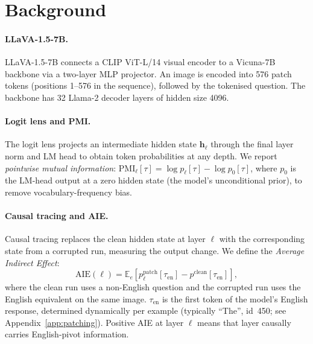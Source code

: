 \documentclass[11pt]{article}
\begin{document}
\section{Background}
\label{sec:background}

\paragraph{LLaVA-1.5-7B.}
LLaVA-1.5-7B \citep{liu-etal-2024-improved} connects a CLIP ViT-L/14 visual
encoder to a Vicuna-7B backbone via a two-layer MLP projector.
An image is encoded into 576 patch tokens (positions 1--576 in the sequence),
followed by the tokenised question.
The backbone has 32 Llama-2 decoder layers of hidden size 4096.

\paragraph{Logit lens and PMI.}
The logit lens \citep{nostalgebraist-2020} projects an intermediate hidden
state $\mathbf{h}_\ell$ through the final layer norm and LM head to obtain
token probabilities at any depth.
We report \emph{pointwise mutual information}:
$\mathrm{PMI}_\ell[\tau] = \log p_\ell[\tau] - \log p_0[\tau]$,
where $p_0$ is the LM-head output at a zero hidden state (the model's
unconditional prior), to remove vocabulary-frequency bias.

\paragraph{Causal tracing and AIE.}
Causal tracing \citep{meng-etal-2022-locating} replaces the clean hidden
state at layer $\ell$ with the corresponding state from a corrupted run,
measuring the output change.
We define the \emph{Average Indirect Effect}:
\begin{equation}
  \mathrm{AIE}(\ell)
  = \mathbb{E}_e\!\left[
      p_\ell^{\text{patch}}\!\left[\tau_{\mathrm{en}}\right]
    - p^{\text{clean}}\!\left[\tau_{\mathrm{en}}\right]
    \right],
\end{equation}
where the clean run uses a non-English question and the corrupted run uses the
English equivalent on the same image.
$\tau_{\mathrm{en}}$ is the first token of the model's English response,
determined dynamically per example (typically ``The'', id~450; see
Appendix~\ref{app:patching}).
Positive AIE at layer $\ell$ means that layer causally carries English-pivot
information.
\end{document}
